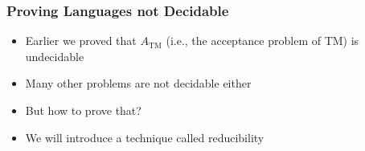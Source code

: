 




\begin{frame}[allowframebreaks] \frametitle{Proving Languages
    not Decidable}
\begin{itemize}
\item Earlier we proved that $A_{\text{TM}}$ (i.e., the acceptance problem of
    TM) is undecidable
  \item Many other problems are not decidable either
  \item But how to prove that?
  \item We will introduce a technique
    called \alert{reducibility}
  \end{itemize}\end{frame}


